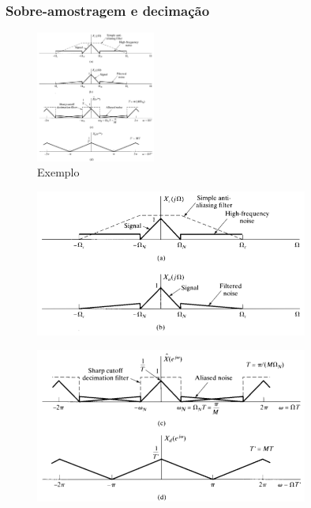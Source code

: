 \begin{frame}[allowframebreaks]
  \frametitle{Sobre-amostragem e decimação}

  \begin{figure}[h!]
  \centering
  \includegraphics[width=0.35\textwidth]{images/oppenheim_fig444.png}
  \caption{Exemplo \citep{oppenheim2009}}
  \label{fig:oppenheim_fig444}
  \end{figure}

  \begin{figure}[h!]
  \centering
  \includegraphics[width=0.8\textwidth]{images/oppenheim_fig444ab.png}
  \label{fig:oppenheim_fig444ab}
  \end{figure}

  \begin{figure}[h!]
  \centering
  \includegraphics[width=0.8\textwidth]{images/oppenheim_fig444cd.png}
  \label{fig:oppenheim_fig444cd}
  \end{figure}

\end{frame}


